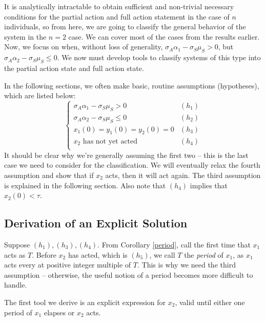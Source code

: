 \documentclass[preprint,12pt]{elsarticle}
\begin{document}
It is analytically intractable to obtain sufficient and non-trivial necessary conditions for the partial action and full action statement in the case of $n$ individuals, so from here, we are going to classify the general behavior of the system in the $n=2$ case. We can cover most of the cases from the results earlier. Now, we focus on when, without loss of generality, $\sigma_A\alpha_1 - \sigma_S\mu_S > 0$, but $\sigma_A\alpha_2 - \sigma_S\mu_S \leq 0$. We now must develop tools to classify systems of this type into the partial action state and full action state.

In the following sections, we often make basic, routine assumptions (hypotheses), which are listed below: \[
\begin{cases}
    \sigma_A\alpha_1 - \sigma_S\mu_S > 0 & (h_1)\\
    \sigma_A\alpha_2 - \sigma_S\mu_S \leq 0 & (h_2) \\
    x_1(0)= y_1(0) = y_2(0) =0  & (h_3) \\
    x_2 \text{ has not yet acted} & (h_4) \\
\end{cases}
\]
It should be clear why we're generally assuming the first two -- this is the last case we need to consider for the classification. We will eventually relax the fourth assumption and show that if $x_2$ acts, then it will act again. The third assumption is explained in the following section. Also note that $(h_4)$ implies that $x_2(0) < \tau$.

\subsection{Derivation of an Explicit Solution}\label{subsec:Derivation}

Suppose $(h_1), (h_3), (h_4)$. From Corollary \ref{period}, call the first time that $x_1$ acts as $T$. Before $x_2$ has acted, which is $(h_5)$, we call $T$ the \textit{period} of $x_1$, as $x_1$ acts every at positive integer multiple of $T$. This is why we need the third assumption -- otherwise, the useful notion of a period becomes more difficult to handle.

The first tool we derive is an explicit expression for $x_2$, valid until either one period of $x_1$ elapses or $x_2$ acts.
\end{document}
